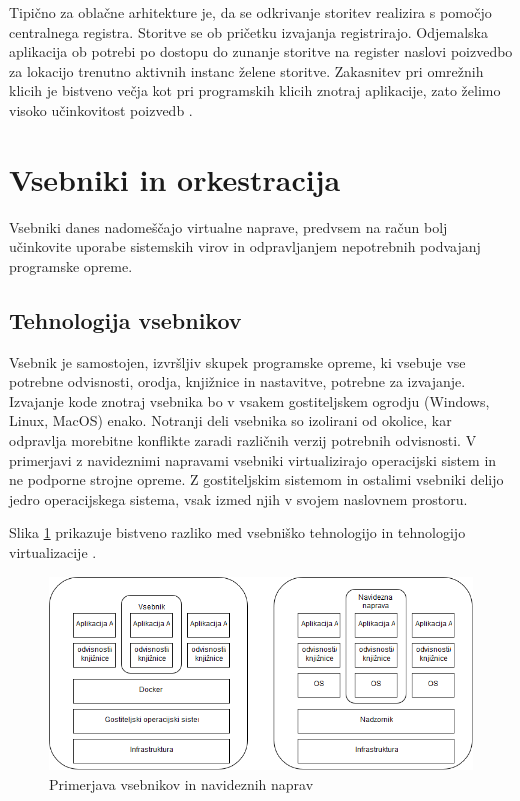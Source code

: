 \documentclass[a4paper, 12pt]{book}
\begin{document}
Tipično za oblačne arhitekture je, da se odkrivanje storitev realizira s pomočjo centralnega registra.
Storitve se ob pričetku izvajanja registrirajo.
Odjemalska aplikacija ob potrebi po dostopu do zunanje storitve na register naslovi poizvedbo za lokacijo trenutno aktivnih instanc želene storitve.
Zakasnitev pri omrežnih klicih je bistveno večja kot pri programskih klicih znotraj aplikacije, zato želimo visoko učinkovitost poizvedb \cite{serviceDiscovery, maldip}.

\section{Vsebniki in orkestracija}

Vsebniki danes nadomeščajo virtualne naprave, predvsem na račun bolj učinkovite uporabe sistemskih virov in odpravljanjem nepotrebnih podvajanj programske opreme.

\subsection{Tehnologija vsebnikov}
Vsebnik je samostojen, izvršljiv skupek programske opreme, ki vsebuje vse potrebne odvisnosti, orodja, knjižnice in nastavitve, potrebne za izvajanje.
Izvajanje kode znotraj vsebnika bo v vsakem gostiteljskem ogrodju (Windows, Linux, MacOS) enako.
Notranji deli vsebnika so izolirani od okolice, kar odpravlja morebitne konflikte zaradi različnih verzij potrebnih odvisnosti.
V primerjavi z navideznimi napravami vsebniki virtualizirajo operacijski sistem in ne podporne strojne opreme.
Z gostiteljskim sistemom in ostalimi vsebniki delijo jedro operacijskega sistema, vsak izmed njih v svojem naslovnem prostoru.

Slika \ref{vm_vs_container} prikazuje bistveno razliko med vsebniško tehnologijo in tehnologijo virtualizacije \cite{dockerContainer}.

\begin{figure}[h]
	\includegraphics[width=1.0\textwidth]{slike/vsebniki_vm.png}
	\caption{Primerjava vsebnikov in navideznih naprav}
	\label{vm_vs_container}
\end{figure}
\end{document}
